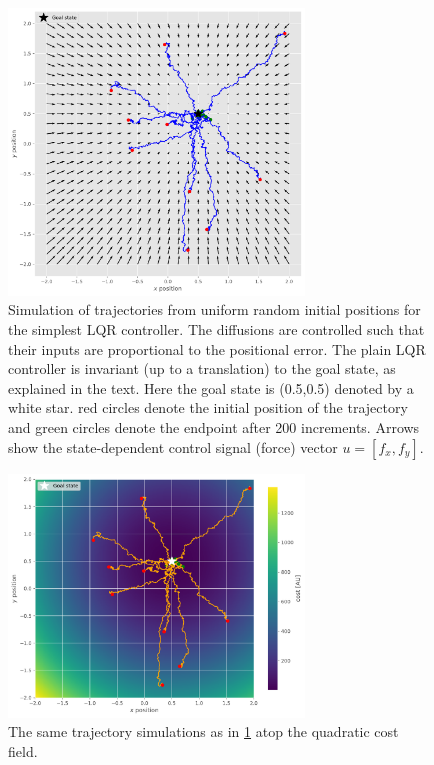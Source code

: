 \documentclass[
  a4paper,
]{article}
\begin{document}
\begin{figure}
\hypertarget{fig:control_field}{%
\centering
\includegraphics[width=0.7\textwidth,height=\textheight]{images/simulations/control_field.pdf}
\caption{Simulation of trajectories from uniform random initial
positions for the simplest LQR controller. The diffusions are controlled
such that their inputs are proportional to the positional error. The
plain LQR controller is invariant (up to a translation) to the goal
state, as explained in the text. Here the goal state is (0.5,0.5)
denoted by a white star. red circles denote the initial position of the
trajectory and green circles denote the endpoint after 200 increments.
Arrows show the state-dependent control signal (force) vector
\(u = [f_x,f_y]\).}\label{fig:control_field}
}
\end{figure}

\begin{figure}
\hypertarget{fig:cost_field}{%
\centering
\includegraphics[width=0.7\textwidth,height=\textheight]{images/simulations/cost_field.pdf}
\caption{The same trajectory simulations as in \cref{fig:control_field}
atop the quadratic cost field.}\label{fig:cost_field}
}
\end{figure}
\end{document}

